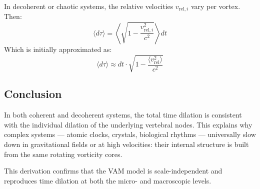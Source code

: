 In decoherent or chaotic systems, the relative velocities \( v_{\text{rel}, i} \) vary per vortex. Then:
\begin{equation}
\langle d\tau \rangle = \left\langle \sqrt{1 - \frac{v_{\text{rel}, i}^2}{c^2}} \right\rangle dt
\end{equation}
Which is initially approximated as:
\begin{equation}
\langle d\tau \rangle \approx dt \cdot \sqrt{1 - \frac{\langle v_\text{rel}^2 \rangle}{c^2}} \label{eq:average_dil}
\end{equation}

\subsection*{Conclusion}

In both coherent and decoherent systems, the total time dilation is consistent with the individual dilation of the underlying vertebral nodes. This explains why complex systems — atomic clocks, crystals, biological rhythms — universally slow down in gravitational fields or at high velocities: their internal structure is built from the same rotating vorticity cores.

\vspace{1em}
\noindent
This derivation confirms that the VAM model is scale-independent and reproduces time dilation at both the micro- and macroscopic levels.